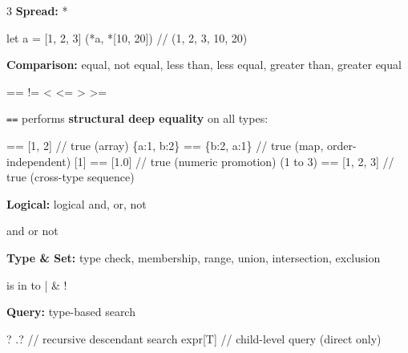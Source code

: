 \documentclass[8pt,landscape,a4paper,oneside]{article}
\newenvironment{Shaded}{%
  \begin{snugshade}%
  \vspace{0.4\baselineskip}%
  \fontsize{9}{10}\selectfont%
  \setlength{\parskip}{0pt}%
  \setlength{\topsep}{0pt}%
  \setlength{\partopsep}{0pt}%
}{%
  \vspace{0.01\baselineskip}%
  \end{snugshade}%
}
\newcommand{\NormalTok}[1]{#1}
\begin{document}
\begin{multicols*}{3}
\textbf{Spread:} *

\begin{Shaded}
\begin{Highlighting}[]
\NormalTok{let a = [1, 2, 3]}
\NormalTok{(*a, *[10, 20])    // (1, 2, 3, 10, 20)}
\end{Highlighting}
\end{Shaded}

\textbf{Comparison:} equal, not equal, less than, less equal, greater
than, greater equal

\begin{Shaded}
\begin{Highlighting}[]
\NormalTok{==  !=  \textless{}  \textless{}=  \textgreater{}  \textgreater{}=}
\end{Highlighting}
\end{Shaded}

\texttt{==} performs \textbf{structural deep equality} on all types:

\begin{Shaded}
\begin{Highlighting}[]
\NormalTok{[1, 2] == [1, 2]          // true  (array)}
\NormalTok{\{a:1, b:2\} == \{b:2, a:1\}  // true  (map, order{-}independent)}
\NormalTok{[1] == [1.0]              // true  (numeric promotion)}
\NormalTok{(1 to 3) == [1, 2, 3]     // true  (cross{-}type sequence)}
\end{Highlighting}
\end{Shaded}

\textbf{Logical:} logical and, or, not

\begin{Shaded}
\begin{Highlighting}[]
\NormalTok{and  or  not}
\end{Highlighting}
\end{Shaded}

\textbf{Type \& Set:} type check, membership, range, union,
intersection, exclusion

\begin{Shaded}
\begin{Highlighting}[]
\NormalTok{is  in  to  |  \&  !}
\end{Highlighting}
\end{Shaded}

\textbf{Query:} type-based search

\begin{Shaded}
\begin{Highlighting}[]
\NormalTok{?   .?           // recursive descendant search}
\NormalTok{expr[T]          // child{-}level query (direct only)}
\end{Highlighting}
\end{Shaded}


\end{multicols*}
\end{document}
